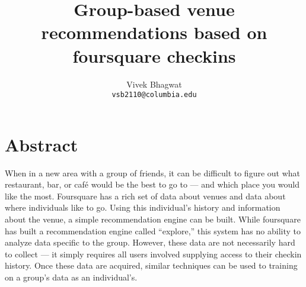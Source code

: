 \documentclass[11pt]{article}
\title{Group-based venue recommendations based on foursquare checkins}
\author{Vivek Bhagwat\\
{\tt vsb2110@columbia.edu}
}
\begin{document}
\maketitle

\section{Abstract}
When in a new area with a group of friends, it can be difficult to figure out what restaurant, bar, or caf\'e would be the best to go to ---
and which place you would like the most. Foursquare has a rich set of data about venues and data about where individuals like to go. 
Using this individual's history and information about the venue, a simple recommendation engine can be built. While foursquare 
has built a recommendation engine called ``explore,'' this system has no ability to analyze data specific to the group. However,
these data are not necessarily hard to collect --- it simply requires all users involved supplying access to their checkin history.
Once these data are acquired, similar techniques can be used to training on a group's data as an individual's.
\end{document}
